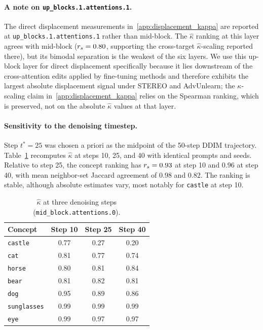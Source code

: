 \paragraph{A note on \texttt{up\_blocks.1.attentions.1}.} The direct displacement measurements in~\cref{app:displacement_kappa} are reported at \texttt{up\_blocks.1.attentions.1} rather than mid-block. The $\hat\kappa$ ranking at this layer agrees with mid-block ($r_s = 0.80$, supporting the cross-target $\hat\kappa$-scaling reported there), but its bimodal separation is the weakest of the six layers. We use this up-block layer for direct displacement specifically because it lies downstream of the cross-attention edits applied by fine-tuning methods and therefore exhibits the largest absolute displacement signal under STEREO and AdvUnlearn; the $\kappa$-scaling claim in~\cref{app:displacement_kappa} relies on the Spearman ranking, which is preserved, not on the absolute $\hat\kappa$ values at that layer.

\paragraph{Sensitivity to the denoising timestep.} Step $t^*=25$ was chosen a
priori as the midpoint of the 50-step DDIM trajectory. Table~\ref{tab:timestep}
recomputes $\hat\kappa$ at steps 10, 25, and 40 with identical prompts and
seeds. Relative to step 25, the concept ranking has $r_s=0.93$ at step 10 and
$0.96$ at step 40, with mean neighbor-set Jaccard agreement of $0.98$ and $0.82$.
The ranking is stable, although absolute estimates vary, most notably for
\texttt{castle} at step 10.

\begin{table}[h]\centering\small
\caption{$\hat\kappa$ at three denoising steps (\texttt{mid\_block.attentions.0}).}
\label{tab:timestep}
\begin{tabular}{lccc}\toprule
Concept & Step 10 & Step 25 & Step 40\\\midrule
\texttt{castle} & 0.77 & 0.27 & 0.20\\
\texttt{cat} & 0.81 & 0.77 & 0.74\\
\texttt{horse} & 0.80 & 0.81 & 0.84\\
\texttt{bear} & 0.81 & 0.82 & 0.81\\
\texttt{dog} & 0.95 & 0.89 & 0.86\\
\texttt{sunglasses} & 0.99 & 0.99 & 0.99\\
\texttt{eye} & 0.99 & 0.97 & 0.97\\\bottomrule
\end{tabular}
\end{table}

